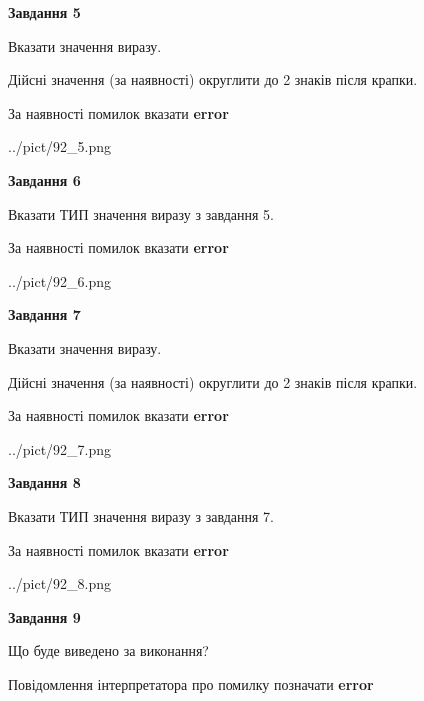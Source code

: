 \documentclass[11pt, ukrainian]{article}
\begin{document}
{\begin {large}
{\begin {center}\textbf{Завдання 5}\end {center}}\par
Вказати значення виразу. \par
Дійсні значення (за наявності) округлити до 2 знаків після крапки. \par
За наявності помилок вказати \textbf{error}

\begin{center}
	{../pict/92_5.png}
\end{center}
\newpage

{\begin {center}\textbf{Завдання 6}\end {center}}\par
Вказати ТИП значення виразу з завдання 5. \par
За наявності помилок вказати \textbf{error}

\begin{center}
	{../pict/92_6.png}
\end{center}
\newpage

{\begin {center}\textbf{Завдання 7}\end {center}}\par
Вказати значення виразу. \par
Дійсні значення (за наявності) округлити до 2 знаків після крапки. \par
За наявності помилок вказати \textbf{error}

\begin{center}
	{../pict/92_7.png}
\end{center}
\newpage

{\begin {center}\textbf{Завдання 8}\end {center}}\par
Вказати ТИП значення виразу з завдання 7. \par
За наявності помилок вказати \textbf{error}

\begin{center}
	{../pict/92_8.png}
\end{center}
\newpage

{\begin {center}\textbf{Завдання 9}\end {center}}\par
Що буде виведено за виконання? \par
Повідомлення інтерпретатора про помилку позначати \textbf{error}


\end{large}}
\end{document}
